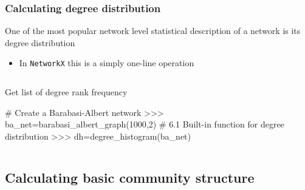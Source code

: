 \documentclass[xcolor=dvipsnames, 9pt]{beamer}
\begin{document}
\begin{frame}[fragile]
    \frametitle{Calculating degree distribution}
    One of the most popular network level statistical description of a network is its degree distribution
    \begin{itemize}
        \item In \texttt{NetworkX} this is a simply one-line operation
    \end{itemize}
    \begin{columns}
         \begin{block}{Get list of degree rank frequency}
                \begin{code}
# Create a Barabasi-Albert network
>>> ba_net=barabasi_albert_graph(1000,2)   
# 6.1 Built-in function for degree distribution
>>> dh=degree_histogram(ba_net)
                \end{code}
         \end{block}
    \end{columns}
\end{frame}



\subsection{Calculating basic community structure} %
\label{sub:calculating_basic_community_structure}
\end{document}

